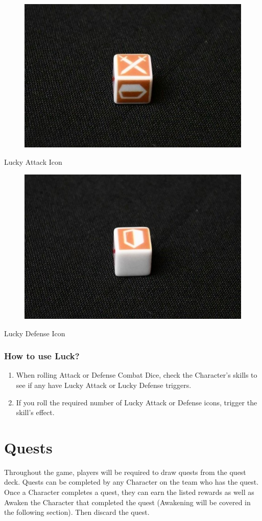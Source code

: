 \documentclass[../main.tex]{subfiles}
\begin{document}
\begin{figure}[h]
    \centering
    \includegraphics[width=0.5\linewidth]{chapters//Skills/TimeStrikeLuckyAttackIcon.jpg}
\end{figure}
Lucky Attack Icon 

\begin{figure}[h]
    \centering
    \includegraphics[width=0.5\linewidth]{chapters//Skills/TimeStrikeLuckyDefenseIcon.jpg}
\end{figure}
Lucky Defense Icon

\subsubsection{How to use Luck?}
\begin{enumerate}
    \item When rolling Attack or Defense Combat Dice, check the Character’s skills to see if any have Lucky Attack or Lucky Defense triggers.
    \item If you roll the required number of Lucky Attack or Defense icons, trigger the skill’s effect.
\end{enumerate}

\section{Quests}
Throughout the game, players will be required to draw quests from the quest deck. Quests can be completed by any Character on the team who has the quest. Once a Character completes a quest, they can earn the listed rewards as well as Awaken the Character that completed the quest (Awakening will be covered in the following section). Then discard the quest.
\end{document}
